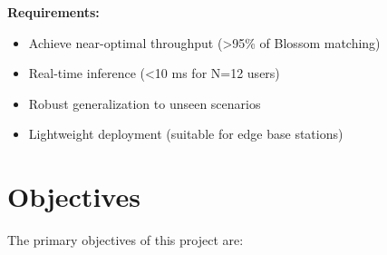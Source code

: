 \textbf{Requirements:}
\begin{itemize}
    \item Achieve near-optimal throughput (>95\% of Blossom matching)
    \item Real-time inference (<10 ms for N=12 users)
    \item Robust generalization to unseen scenarios
    \item Lightweight deployment (suitable for edge base stations)
\end{itemize}

\section{Objectives}

The primary objectives of this project are:

